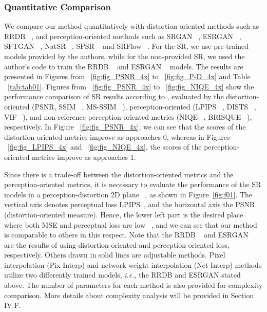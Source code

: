 \documentclass{article}
\begin{document}
\subsubsection{Quantitative Comparison}
We compare our method quantitatively with distortion-oriented methods such as RRDB ~\cite{2018esrgan}, and perception-oriented methods such as SRGAN ~\cite{2017photo}, ESRGAN ~\cite{2018esrgan}, SFTGAN ~\cite{2018recovering}, NatSR ~\cite{2019natural}, SPSR ~\cite{2020structure} and SRFlow ~\cite{2020srflow}. For the  SR, we use pre-trained models provided by the authors, while for the non-provided  SR, we used the author's code to train the RRDB ~\cite{2018esrgan} and ESRGAN ~\cite{2018esrgan} models. The results are presented in Figures from ~\ref{fig:fig_PSNR_4x} to ~\ref{fig:fig_P-D_4x} and Table ~\ref{tab:tab01}.
Figures from ~\ref{fig:fig_PSNR_4x} to ~\ref{fig:fig_NIQE_4x} show the performance comparison of  SR results according to , evaluated by the distortion-oriented (PSNR, SSIM ~\cite{wang2004image}, MS-SSIM ~\cite{wang2003multiscale}), perception-oriented (LPIPS ~\cite{zhang2018unreasonable}, DISTS ~\cite{ding2020image}, VIF ~\cite{sheikh2006image}), and non-reference perception-oriented metrics (NIQE ~\cite{mittal2012making}, BRISQUE ~\cite{mittal2012no}), respectively. In Figure ~\ref{fig:fig_PSNR_4x}, we can see that the scores of the distortion-oriented metrics improve as  approaches 0, whereas in Figures ~\ref{fig:fig_LPIPS_4x} and ~\ref{fig:fig_NIQE_4x}, the scores of the perception-oriented metrics improve as  approaches 1.


Since there is a trade-off between the distortion-oriented metrics and the perception-oriented metrics, it is necessary to evaluate the performance of the SR models in a perception-distortion 2D plane ~\cite{blau2018perception}, as shown in Figure~\ref{fig:f01}. The vertical axis denotes perceptual loss LPIPS~\cite{zhang2018unreasonable}, and the horizontal axis the PSNR (distortion-oriented measure). Hence, the lower left part is the desired place where both MSE and perceptual loss are low ~\cite{blau2018perception}, and we can see that our method is comparable to others in this respect. Note that the RRDB ~\cite{2018esrgan} and ESRGAN ~\cite{2018esrgan} are the results of using distortion-oriented and perception-oriented loss, respectively. Others drawn in solid lines are adjustable methods. Pixel interpolation (Pix-Interp) and network weight interpolation (Net-Interp) methods utilize two differently trained models, {\em i.e.}, the RRDB and ESRGAN stated above. The number of parameters for each method is also provided for complexity comparison. More details about complexity analysis will be provided in Section IV.F.
\end{document}
